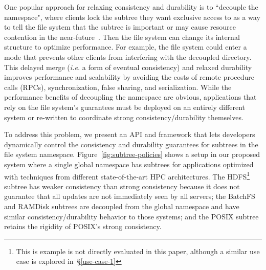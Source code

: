 One popular approach for relaxing consistency and durability is to ``decouple
the namespace", where clients lock the subtree they want exclusive access to as
a way to tell the file system that the subtree is important or may cause
resource contention in the near-future~\cite{grider:pdsw2015-marfs,
zheng:pdsw2015-deltafs, zheng:pdsw2014-batchfs, ren:sc2014-indexfs,
bent:slides-twotiers}. Then the file system can change its internal structure
to optimize performance. For example, the file system could enter a mode that
prevents other clients from interfering with the decoupled directory.  This
delayed merge ({\it i.e.} a form of eventual consistency) and relaxed
durability improves performance and scalability by avoiding the costs of remote
procedure calls (RPCs), synchronization, false sharing, and serialization.
While the performance benefits of decoupling the namespace are obvious,
applications that rely on the file system's guarantees must be deployed on an
entirely different system or re-written to coordinate strong
consistency/durability themselves.

%

To address this problem, we present an API and framework that lets developers
dynamically control the consistency and durability guarantees for subtrees in
the file system namespace.  Figure~\ref{fig:subtree-policies} shows a setup in
our proposed system where a single global namespace has subtrees for
applications optimized with techniques from different state-of-the-art HPC
architectures.  The HDFS\footnote{This is example is not directly evaluated in
this paper, although a similar use case is explored in~\S\ref{use-case-1}}
subtree has weaker consistency than strong consistency because it  does not
guarantee that all updates are not immediately seen by all servers; the BatchFS
and RAMDisk subtrees are decoupled from the global namespace and have similar
consistency/durability behavior to those systems; and the POSIX subtree retains
the rigidity of POSIX's strong consistency.

